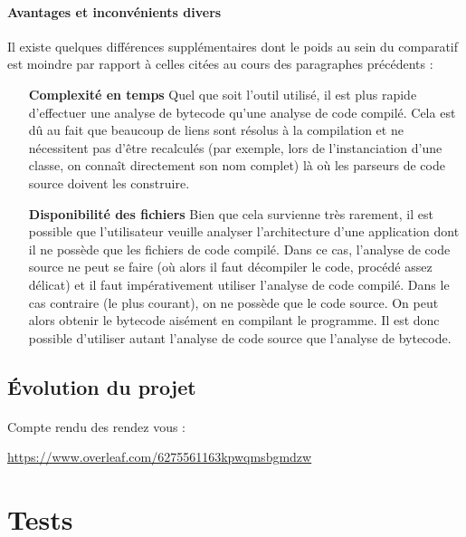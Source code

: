 \documentclass{scrartcl}
\begin{document}
        \paragraph{Avantages et inconvénients divers} Il existe quelques différences supplémentaires dont le poids au sein du comparatif est moindre par rapport à celles citées au cours des paragraphes précédents :
        \begin{itemize}
            \item[\textbf{Complexité en temps}] Quel que soit l'outil utilisé, il est plus rapide d'effectuer une analyse de bytecode qu'une analyse de code compilé. Cela est dû au fait que beaucoup de liens sont résolus à la compilation et ne nécessitent pas d'être recalculés (par exemple, lors de l'instanciation d'une classe, on connaît directement son nom complet) là où les parseurs de code source doivent les construire.
            \item[\textbf{Disponibilité des fichiers}] Bien que cela survienne très rarement, il est possible que l'utilisateur veuille analyser l'architecture d'une application dont il ne possède que les fichiers de code compilé. Dans ce cas, l'analyse de code source ne peut se faire (où alors il faut décompiler le code, procédé assez délicat) et il faut impérativement utiliser l'analyse de code compilé. Dans le cas contraire (le plus courant), on ne possède que le code source. On peut alors obtenir le bytecode aisément en compilant le programme. Il est donc possible d'utiliser autant l'analyse de code source que l'analyse de bytecode.
        \end{itemize}
        
        \subsection{Évolution du projet}
        \paragraph{}Compte rendu des rendez vous :
        \begin{center}
            \url{https://www.overleaf.com/6275561163kpwqmsbgmdzw}
        \end{center}
        
    
    
    

\newpage
\section{Tests}
\end{document}
